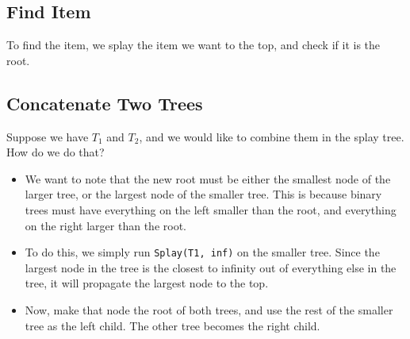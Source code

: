 \documentclass[10pt]{article}
\begin{document}
\subsection*{Find Item}
To find the item, we splay the item we want to the top, and check if it is the root.

\subsection*{Concatenate Two Trees}
Suppose we have $T_1$ and $T_2$, and we would like to combine them in the splay tree.  How do we do that?
\begin{itemize}
	\item We want to note that the new root must be either the smallest node of the larger tree, or the largest node of the smaller tree.  This is because binary trees must have everything on the left smaller than the root, and everything on the right larger than the root.
	\item To do this, we simply run \texttt{Splay(T1, inf)} on the smaller tree.  Since the largest node in the tree is the closest to infinity out of everything else in the tree, it will propagate the largest node to the top.
	\item Now, make that node the root of both trees, and use the rest of the smaller tree as the left child.  The other tree becomes the right child.
\end{itemize}
\end{document}
